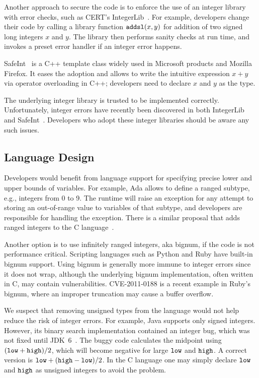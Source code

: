 Another approach to secure the code is to enforce the use of an integer
library with error checks, such as CERT's
IntegerLib~\cite[INT03-C]{seacord:secure-c}.  For example, developers
change their code by calling a library function $\texttt{addsl}(x, y)$
for addition of two signed long integers $x$ and $y$.  The library
then performs sanity checks at run time, and invokes a preset error
handler if an integer error happens.

SafeInt~\cite{safeint} is a C++ template class widely used in Microsoft
products and Mozilla Firefox.  It eases the adoption and allows to write
the intuitive expression $x + y$ via operator overloading in C++;
developers need to declare $x$ and $y$ as the 
type.

The underlying integer library is trusted to be implemented correctly.
Unfortunately, integer errors have recently been discovered in both
IntegerLib and SafeInt~\cite{ioc}.  Developers who adopt these
integer libraries should be aware any such issues.
%
%
%


\subsection{Language Design}

Developers would benefit from language support for specifying precise
lower and upper bounds of variables.  For example, Ada allows to
define a ranged subtype, e.g., integers from 0 to 9.  The runtime
will raise an exception for any attempt to storing an out-of-range
value to variables of that subtype, and developers are responsible
for handling the exception.  There is a similar proposal that adds
ranged integers to the C language~\cite{ranged-c}.

Another option is to use infinitely ranged integers, aka bignum,
if the code is not performance critical.  Scripting languages such
as Python and Ruby have built-in bignum support.  Using bignum is
generally more immune to integer errors since it does not wrap,
although the underlying bignum implementation, often written in C,
may contain vulnerabilities.  CVE-2011-0188 is a recent example in
Ruby's bignum, where an improper truncation may cause a buffer
overflow.
%

We suspect that removing unsigned types from the language would
not help reduce the risk of integer errors.  For example, Java
supports only signed integers.  However, its binary search
implementation contained an integer bug, which was not fixed until
JDK~6~\cite{java-bsearch}.  The buggy code calculates the midpoint
using $(\texttt{low} + \texttt{high})/2$, which will become negative for
large $\texttt{low}$ and $\texttt{high}$.  A correct version is $\texttt{low}
+ (\texttt{high}-\texttt{low})/2$.  In the C language one may simply declare
$\texttt{low}$ and $\texttt{high}$ as unsigned integers to avoid the problem.

